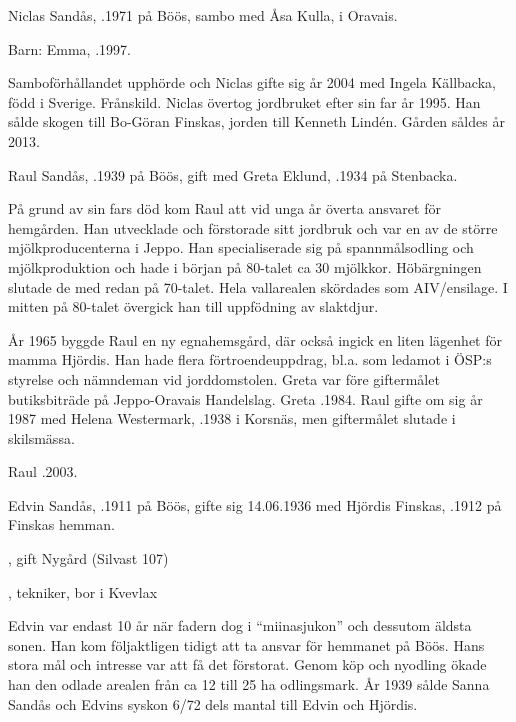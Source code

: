 Niclas Sandås,  .1971 på Böös, sambo med Åsa Kulla,  i Oravais.

Barn: Emma, .1997.

Samboförhållandet upphörde och Niclas gifte sig år 2004 med Ingela Källbacka, född i Sverige. Frånskild. Niclas övertog jordbruket efter sin far år 1995. Han sålde  skogen till Bo-Göran Finskas, jorden till Kenneth Lindén. Gården såldes år 2013.


Raul Sandås, .1939 på Böös, gift med Greta Eklund, .1934 på Stenbacka.
\begin{jhchildren}
  \item {}
  \item {}
\end{jhchildren}
På grund av sin fars död kom Raul att vid unga år överta ansvaret för hemgården. Han utvecklade och förstorade sitt jordbruk och var en av de större mjölkproducenterna i Jeppo. Han specialiserade sig på spannmålsodling och mjölkproduktion och hade i början på 80-talet ca 30 mjölkkor. Höbärgningen slutade de med redan på 70-talet. Hela vallarealen skördades som AIV/ensilage. I mitten på 80-talet övergick han till uppfödning av slaktdjur.

År 1965 byggde Raul en ny egnahemsgård, där också ingick en liten lägenhet för mamma Hjördis. Han hade flera förtroendeuppdrag, bl.a. som ledamot i ÖSP:s styrelse och nämndeman vid jorddomstolen. Greta var före giftermålet butiksbiträde på Jeppo-Oravais Handelslag. Greta .1984. Raul gifte om sig år 1987 med Helena Westermark, .1938 i Korsnäs, men giftermålet slutade i skilsmässa.

Raul .2003.




Edvin Sandås, .1911 på Böös, gifte sig 14.06.1936 med Hjördis	Finskas, .1912 på Finskas hemman.
\begin{jhchildren}
  \item {}, gift Nygård (Silvast  107)
  \item {}
  \item {}, tekniker, bor i Kvevlax
\end{jhchildren}
Edvin var endast 10 år när fadern dog i ``miinasjukon'' och dessutom äldsta sonen. Han kom följaktligen tidigt att ta ansvar för hemmanet på Böös. Hans stora mål och intresse var att få det förstorat. Genom köp och nyodling ökade han den odlade arealen från ca 12 till 25 ha odlingsmark. År 1939 sålde Sanna Sandås och Edvins syskon 6/72 dels mantal till Edvin och Hjördis.

